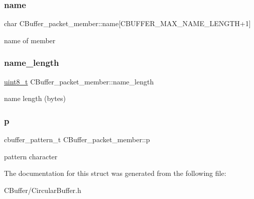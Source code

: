\subsubsection{\texorpdfstring{name}{name}}
{\footnotesize\ttfamily char C\+Buffer\+\_\+packet\+\_\+member\+::name\mbox{[}C\+B\+U\+F\+F\+E\+R\+\_\+\+M\+A\+X\+\_\+\+N\+A\+M\+E\+\_\+\+L\+E\+N\+G\+TH+1\mbox{]}}

name of member \mbox{\label{structCBuffer__packet__member_a8574aa9dd31388056a17af795c51ec6e}} 
\subsubsection{\texorpdfstring{name\+\_\+length}{name\_length}}
{\footnotesize\ttfamily \hyperlink{vl53l0x__types_8h_aba7bc1797add20fe3efdf37ced1182c5}{uint8\+\_\+t} C\+Buffer\+\_\+packet\+\_\+member\+::name\+\_\+length}

name length (bytes) \mbox{\label{structCBuffer__packet__member_aabf9f715818b2a5e4f1f5c6361e8b866}} 
\subsubsection{\texorpdfstring{p}{p}}
{\footnotesize\ttfamily cbuffer\+\_\+pattern\+\_\+t C\+Buffer\+\_\+packet\+\_\+member\+::p}

pattern character 

The documentation for this struct was generated from the following file\+:\begin{DoxyCompactItemize}
\item 
C\+Buffer/Circular\+Buffer.\+h\end{DoxyCompactItemize}
